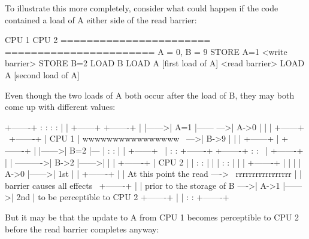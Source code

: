 To illustrate this more completely, consider what could happen if the code
contained a load of A either side of the read barrier:

\begin{VerbatimU}
	CPU 1                   CPU 2
	=======================	=======================
		{ A = 0, B = 9 }
	STORE A=1
	<write barrier>
	STORE B=2
	                        LOAD B
	                        LOAD A [first load of A]
	                        <read barrier>
	                        LOAD A [second load of A]
\end{VerbatimU}

Even though the two loads of A both occur after the load of B, they may both
come up with different values:

\begin{VerbatimU}
	+-------+       :      :                :       :
	|       |       +------+                +-------+
	|       |------>| A=1  |------      --->| A->0  |
	|       |       +------+      \         +-------+
	| CPU 1 |   wwwwwwwwwwwwwwww   \    --->| B->9  |
	|       |       +------+        |       +-------+
	|       |------>| B=2  |---     |       :       :
	|       |       +------+   \    |       :       :       +-------+
	+-------+       :      :    \   |       +-------+       |       |
	                             ---------->| B->2  |------>|       |
	                                |       +-------+       | CPU 2 |
	                                |       :       :       |       |
	                                |       :       :       |       |
	                                |       +-------+       |       |
	                                |       | A->0  |------>| 1st   |
	                                |       +-------+       |       |
	  At this point the read ---->   \  rrrrrrrrrrrrrrrrr   |       |
	  barrier causes all effects      \     +-------+       |       |
	  prior to the storage of B        ---->| A->1  |------>| 2nd   |
	  to be perceptible to CPU 2            +-------+       |       |
	                                        :       :       +-------+
\end{VerbatimU}

But it may be that the update to A from CPU 1 becomes perceptible to CPU 2
before the read barrier completes anyway:

